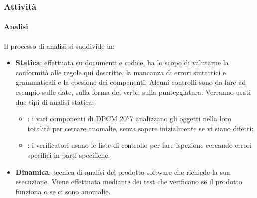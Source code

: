 		\subsubsection{Attività}
			\paragraph{Analisi}
			Il processo di analisi si suddivide in:
			\begin{itemize}
			\item \textbf{Statica}: effettuata su documenti e codice, ha lo scopo di valutarne la conformità alle regole qui descritte, la mancanza di errori sintattici e grammaticali e la coesione dei componenti. Alcuni controlli sono da fare ad esempio sulle date, sulla forma dei verbi, sulla punteggiatura. Verranno usati due tipi di analisi statica:
			\begin{itemize}
				\item \textbf{}: i vari componenti di DPCM 2077 analizzano gli oggetti nella loro totalità per cercare anomalie, senza sapere inizialmente se vi siano difetti;
				\item \textbf{}: i verificatori usano le liste di controllo per fare ispezione cercando errori specifici in parti specifiche.
			\end{itemize}
			\item \textbf{Dinamica}: tecnica di analisi del prodotto software che richiede la sua esecuzione. Viene effettuata mediante dei test che verificano se il prodotto funziona o se ci sono anomalie.
			\end{itemize}
